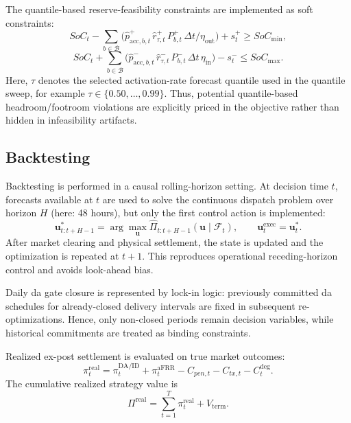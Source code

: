 The quantile-based reserve-feasibility constraints are implemented as soft constraints:
\begin{equation}\label{eq:soft-p90-pos}
    SoC_t - \sum_{b\in\mathcal{B}}\Big(\hat{p}^{+}_{\mathrm{acc},b,t}\,\hat{r}^{+}_{\tau,t}\,P^{+}_{b,t}\,\Delta t/\eta_{\text{out}}\Big) + s_t^{+}
    \ge SoC_{\min},
\end{equation}
\begin{equation}\label{eq:soft-p90-neg}
    SoC_t + \sum_{b\in\mathcal{B}}\Big(\hat{p}^{-}_{\mathrm{acc},b,t}\,\hat{r}^{-}_{\tau,t}\,P^{-}_{b,t}\,\Delta t\,\eta_{\text{in}}\Big) - s_t^{-}
    \le SoC_{\max}.
\end{equation}
Here, $\tau$ denotes the selected activation-rate forecast quantile used in the quantile sweep, for example $\tau \in \{0.50,\dots,0.99\}$.
Thus, potential quantile-based headroom/footroom violations are explicitly priced in the objective rather than hidden in infeasibility artifacts.

\subsection{Backtesting}
Backtesting is performed in a causal rolling-horizon setting. At decision time $t$, forecasts available at $t$ are used to solve the continuous dispatch problem over horizon $H$ (here: 48 hours), but only the first control action is implemented:
\begin{equation}\label{eq:rolling-policy}
    \mathbf{u}^{*}_{t:t+H-1}
    =
    \arg\max_{\mathbf{u}} \hat{\Pi}_{t:t+H-1}(\mathbf{u}\mid\mathcal{F}_t),
    \qquad
    \mathbf{u}^{\mathrm{exec}}_{t}=\mathbf{u}^{*}_{t}.
\end{equation}
After market clearing and physical settlement, the state is updated and the optimization is repeated at $t+1$. This reproduces operational receding-horizon control and avoids look-ahead bias.

Daily \gls{da} gate closure is represented by lock-in logic: previously committed \gls{da} schedules for already-closed delivery intervals are fixed in subsequent re-optimizations. Hence, only non-closed periods remain decision variables, while historical commitments are treated as binding constraints.

Realized ex-post settlement is evaluated on true market outcomes:
\begin{equation}\label{eq:realized-hourly-pnl}
    \pi^{\mathrm{real}}_{t}
    =
    \pi^{\mathrm{DA/ID}}_{t}
    +
    \pi^{\mathrm{aFRR}}_{t}
    -
    C_{pen,t}
    -
    C_{tx,t}
    -
    C^{\mathrm{deg}}_{t}.
\end{equation}
The cumulative realized strategy value is
\begin{equation}\label{eq:realized-total-pnl}
    \Pi^{\mathrm{real}}=\sum_{t=1}^{T}\pi^{\mathrm{real}}_t + V_{\mathrm{term}}.
\end{equation}

